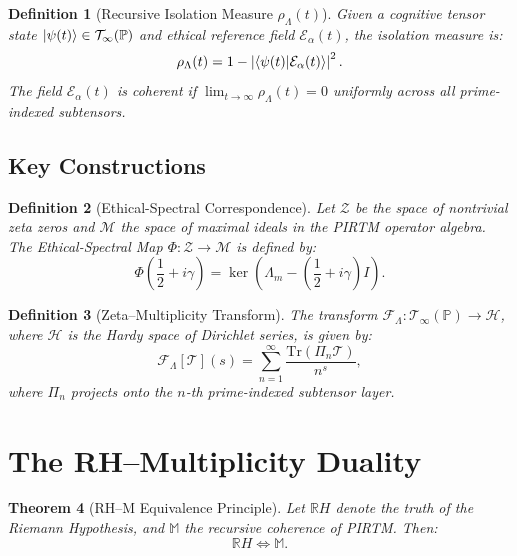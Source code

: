\documentclass[12pt]{article}
\newtheorem{theorem}{Theorem}[section]
\newtheorem{definition}[theorem]{Definition}
\begin{document}
\begin{definition}[Recursive Isolation Measure \(\rho_\Lambda(t)\)]
Given a cognitive tensor state \(\ket{\psi(t)} \in \mathcal{T}_\infty(\mathbb{P})\) and ethical reference field \(\mathcal{E}_\alpha(t)\), the isolation measure is:
\[
\rho_\Lambda(t) = 1 - \left|\braket{\psi(t) | \mathcal{E}_\alpha(t)}\right|^2.
\]
The field \(\mathcal{E}_\alpha(t)\) is \textit{coherent} if \(\lim_{t \to \infty} \rho_\Lambda(t) = 0\) uniformly across all prime-indexed subtensors.
\end{definition}

\subsection{Key Constructions}

\begin{definition}[Ethical-Spectral Correspondence]
Let \(\mathscr{Z}\) be the space of nontrivial zeta zeros and \(\mathscr{M}\) the space of maximal ideals in the PIRTM operator algebra. The \textit{Ethical-Spectral Map} \(\Phi: \mathscr{Z} \to \mathscr{M}\) is defined by:
\[
\Phi\left(\frac{1}{2} + i\gamma\right) = \ker\left(\Lambda_m - (\frac{1}{2} + i\gamma)I\right).
\]
\end{definition}

\begin{definition}[Zeta--Multiplicity Transform]
The transform \(\mathscr{F}_\Lambda: \mathcal{T}_\infty(\mathbb{P}) \to \mathscr{H}\), where \(\mathscr{H}\) is the Hardy space of Dirichlet series, is given by:
\[
\mathscr{F}_\Lambda[\mathcal{T}](s) = \sum_{n=1}^\infty \frac{\text{Tr}(\Pi_n \mathcal{T})}{n^s},
\]
where \(\Pi_n\) projects onto the \(n\)-th prime-indexed subtensor layer.
\end{definition}

\section{The RH--Multiplicity Duality}

\begin{theorem}[RH--M Equivalence Principle]
Let \(\mathbb{R}H\) denote the truth of the Riemann Hypothesis, and \(\mathbb{M}\) the recursive coherence of PIRTM. Then:
\[
\mathbb{R}H \iff \mathbb{M}.
\]
\end{theorem}
\end{document}
